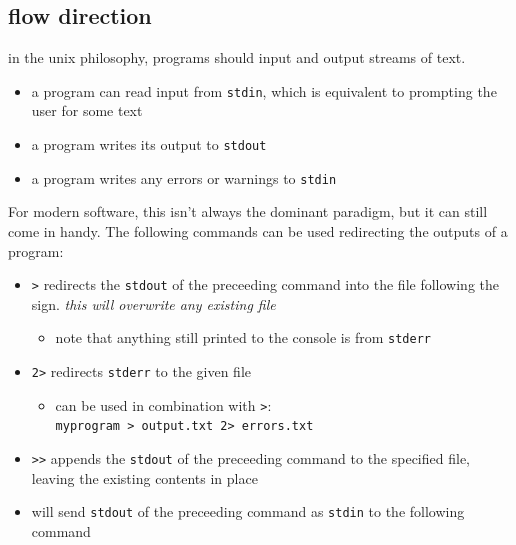 \documentclass[
]{article}
\providecommand{\tightlist}{%
  \setlength{\itemsep}{0pt}\setlength{\parskip}{0pt}}
\begin{document}
\hypertarget{flow-direction}{%
\subsection{flow direction}\label{flow-direction}}

in the unix philosophy, programs should input and output streams of
text.

\begin{itemize}
\tightlist
\item
  a program can read input from \texttt{stdin}, which is equivalent to
  prompting the user for some text
\item
  a program writes its output to \texttt{stdout}
\item
  a program writes any errors or warnings to \texttt{stdin}
\end{itemize}

For modern software, this isn't always the dominant paradigm, but it can
still come in handy. The following commands can be used redirecting the
outputs of a program:

\begin{itemize}
\tightlist
\item
  \texttt{\textgreater{}} redirects the \texttt{stdout} of the
  preceeding command into the file following the sign. \emph{this will
  overwrite any existing file}

  \begin{itemize}
  \tightlist
  \item
    note that anything still printed to the console is from
    \texttt{stderr}
  \end{itemize}
\item
  \texttt{2\textgreater{}} redirects \texttt{stderr} to the given file

  \begin{itemize}
  \tightlist
  \item
    can be used in combination with \texttt{\textgreater{}}:\\
    \texttt{myprogram\ \textgreater{}\ output.txt\ 2\textgreater{}\ errors.txt}
  \end{itemize}
\item
  \texttt{\textgreater{}\textgreater{}} appends the \texttt{stdout} of
  the preceeding command to the specified file, leaving the existing
  contents in place
\item
  \texttt{\textbar{}} will send \texttt{stdout} of the preceeding
  command as \texttt{stdin} to the following command
\end{itemize}
\end{document}
